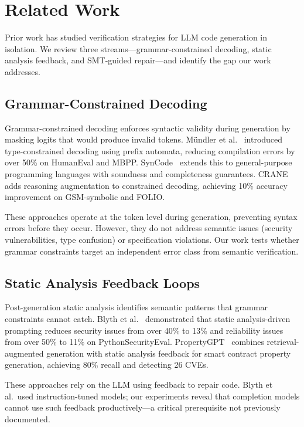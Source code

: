 \section{Related Work}
\label{sec:related}

Prior work has studied verification strategies for LLM code generation in isolation. We review three streams---grammar-constrained decoding, static analysis feedback, and SMT-guided repair---and identify the gap our work addresses.

\subsection{Grammar-Constrained Decoding}

Grammar-constrained decoding enforces syntactic validity during generation by masking logits that would produce invalid tokens. M{\"u}ndler et al.~\cite{mundler2025type} introduced type-constrained decoding using prefix automata, reducing compilation errors by over 50\% on HumanEval and MBPP. SynCode~\cite{qu2025scodegen} extends this to general-purpose programming languages with soundness and completeness guarantees. CRANE~\cite{banerjee2025crane} adds reasoning augmentation to constrained decoding, achieving 10\% accuracy improvement on GSM-symbolic and FOLIO.

These approaches operate at the token level during generation, preventing syntax errors before they occur. However, they do not address semantic issues (security vulnerabilities, type confusion) or specification violations. Our work tests whether grammar constraints target an independent error class from semantic verification.

\subsection{Static Analysis Feedback Loops}

Post-generation static analysis identifies semantic patterns that grammar constraints cannot catch. Blyth et al.~\cite{blyth2025static} demonstrated that static analysis-driven prompting reduces security issues from over 40\% to 13\% and reliability issues from over 50\% to 11\% on PythonSecurityEval. PropertyGPT~\cite{liu2024propertygpt} combines retrieval-augmented generation with static analysis feedback for smart contract property generation, achieving 80\% recall and detecting 26 CVEs.

These approaches rely on the LLM using feedback to repair code. Blyth et al.\ used instruction-tuned models; our experiments reveal that completion models cannot use such feedback productively---a critical prerequisite not previously documented.

